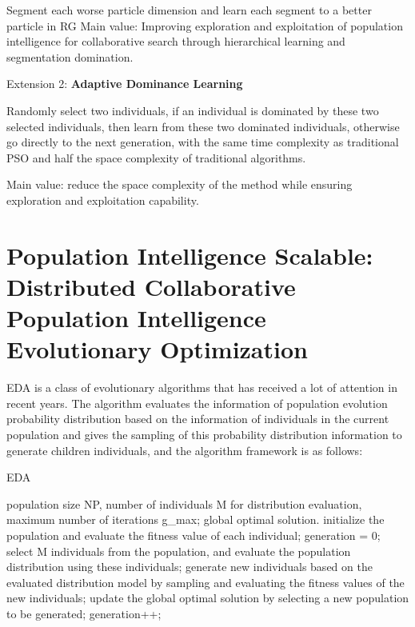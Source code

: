 \documentclass[twocolumn]{article}
\begin{document}
Segment each worse particle dimension and learn each segment to a better particle in RG
Main value: Improving exploration and exploitation of population
intelligence for collaborative search through hierarchical learning
and segmentation domination.


Extension 2: \textbf{Adaptive Dominance Learning}

Randomly select two individuals, if an individual is dominated by
these two selected individuals, then learn from these two dominated
individuals, otherwise go directly to the next generation, with the
same time complexity as traditional PSO and half the space complexity
of traditional algorithms.

Main value: reduce the space complexity of the method while ensuring
exploration and exploitation capability.


\section{Population Intelligence Scalable: Distributed Collaborative Population Intelligence Evolutionary Optimization}


EDA is a class of evolutionary algorithms that has received a lot of
attention in recent years. The algorithm evaluates the information of
population evolution probability distribution based on the information
of individuals in the current population and gives the sampling of this
probability distribution information to generate children individuals,
and the algorithm framework is as follows:


\begin{algorithm}[H]
	\caption{EDA}
	\label{alg:Framwork}
	\begin{algorithmic}[1]
		\Require
		population size NP, number of individuals M for distribution evaluation, maximum number of iterations g\_max;
		\Ensure
		global optimal solution.
		\State 
		initialize the population and evaluate the fitness value of each individual;
		\State
		generation = 0;
		\State
		select M individuals from the population, and evaluate the population distribution using these individuals;
		\State
		generate new individuals based on the evaluated distribution model by sampling and evaluating the fitness values of the new individuals;
		\State
		update the global optimal solution by selecting a new population to be generated;
		\State
		generation++;
		\EndWhile
	\end{algorithmic}
	\label{code}
\end{algorithm}
\end{document}
